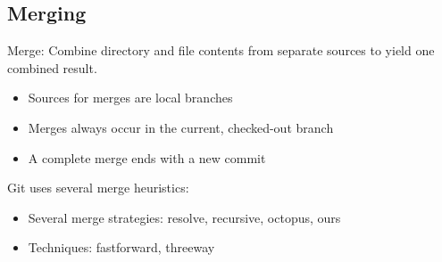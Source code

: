 \documentclass[draftclsnofoot,journal,onecolumn,12pt]{IEEEtran}
\begin{document}
\subsection{Merging}
Merge: Combine directory and file contents from separate sources to yield
one combined result.
\begin{itemize}
  \item Sources for merges are local branches
  \item Merges always occur in the current, checked-out branch
  \item A complete merge ends with a new commit
\end{itemize}

Git uses several merge heuristics:
\begin{itemize}
  \item Several merge strategies: resolve, recursive, octopus, ours
  \item Techniques: fastforward, threeway
\end{itemize}

\nocite{Bonaccorsi20031243}
\nocite{chacon2009pro}
\nocite{Hertel20031159}
\nocite{kernighan1999practice}
\nocite{Kogut01062001}
\nocite{scacchi2006understanding}
\nocite{vonKrogh20031149}
\nocite{Yilmaz06techniquesand}

\renewcommand\refname{References}


\end{document}
